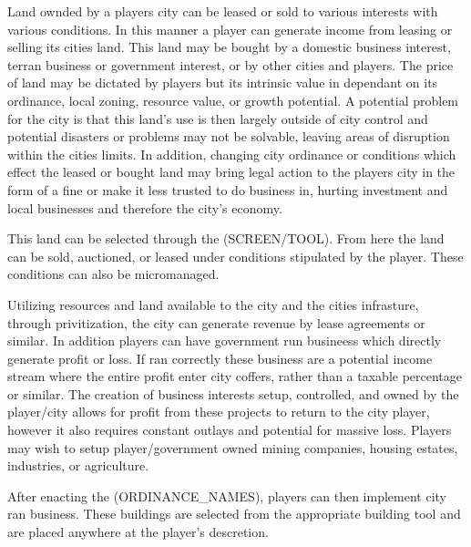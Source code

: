 Land ownded by a players city can be leased or sold to various interests with various conditions. In this manner a player can generate income from leasing or selling its cities land. This land may be bought by a domestic business interest, terran business or government interest, or by other cities and players. The price of land may be dictated by players but its intrinsic value in dependant on its ordinance, local zoning, resource value, or growth potential. %
A potential problem for the city is that this land's use is then largely outside of city control and potential disasters or problems may not be solvable, leaving areas of disruption within the cities limits. In addition, changing city ordinance or conditions which effect the leased or bought land may bring legal action to the players city in the form of a fine or make it less trusted to do business in, hurting investment and local businesses and therefore the city's economy.

This land can be selected through the (SCREEN/TOOL). From here the land can be sold, auctioned, or leased under conditions stipulated by the player. These conditions can also be micromanaged.


Utilizing resources and land available to the city and the cities infrasture, through privitization, the city can generate revenue by lease agreements or similar. In addition players can have government run busineess which directly generate profit or loss. If ran correctly these business are a potential income stream where the entire profit enter city coffers, rather than a taxable percentage or similar. 
The creation of business interests setup, controlled, and owned by the player/city allows for profit from these projects to return to the city player, however it also requires constant outlays and potential for massive loss. Players may wish to setup player/government owned mining companies, housing estates, industries, or agriculture. 

After enacting the (ORDINANCE_NAMES), players can then implement city ran business. These buildings are selected from the appropriate building tool and are placed anywhere at the player's descretion.












